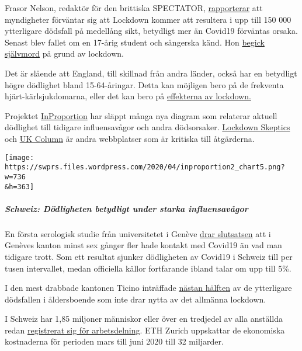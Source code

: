 Frasor Nelson, redaktör för den brittiska SPECTATOR,
\href{https://www.telegraph.co.uk/politics/2020/04/09/boris-worried-lockdown-has-gone-far-can-end/}{rapporterar}
att myndigheter förväntar sig att Lockdown kommer att resultera i upp
till 150 000 ytterligare dödsfall på medellång sikt, betydligt mer än
Covid19 förväntas orsaka. Senast blev fallet om en 17-årig student och
sångerska känd. Hon
\href{https://sports.yahoo.com/coronavirus-bethany-palmer-teenager-death-suicide-152707750.html}{begick
självmord} på grund av lockdown.

Det är slående att England, till skillnad från andra länder, också har
en betydligt högre dödlighet bland 15-64-åringar. Detta kan möjligen
bero på de frekventa hjärt-kärlsjukdomarna, eller det kan bero på
\href{https://www.telegraph.co.uk/global-health/science-and-disease/two-new-waves-deaths-break-nhs-new-analysis-warns/}{effekterna
av lockdown.}

Projektet \href{http://inproportion2.talkigy.com/}{InProportion} har
släppt många nya diagram som relaterar aktuell dödlighet till tidigare
influensavågor och andra dödsorsaker.
\href{https://lockdownsceptics.org/}{Lockdown Skeptics} och
\href{https://www.ukcolumn.org/}{UK Column} är andra webbplatser som är
kritiska till åtgärderna.

\texttt{[image: https://swprs.files.wordpress.com/2020/04/inproportion2\_chart5.png?w=736\\\&h=363]}

\hypertarget{schweiz-duxf6dligheten-betydligt-under-starka-influensavuxe5gor}{%
\subparagraph{\texorpdfstring{\textbf{Schweiz: Dödligheten betydligt
under starka
influensavågor}}{Schweiz: Dödligheten betydligt under starka influensavågor}}\label{schweiz-duxf6dligheten-betydligt-under-starka-influensavuxe5gor}}

En första serologisk studie från universitetet i Genève
\href{https://www.hug-ge.ch/medias/communique-presse/seroprevalence-covid-19-premiere-estimation}{drar
slutsatsen} att i Genèves kanton minst sex gånger fler hade kontakt med
Covid19 än vad man tidigare trott. Som ett resultat sjunker dödligheten
av Covid19 i Schweiz till per tusen intervallet, medan officiella källor
fortfarande ibland talar om upp till 5\%.

I den mest drabbade kantonen Ticino inträffade
\href{https://www.bluewin.ch/de/news/schweiz/sp-chef-levrat-will-die-reichen-schropfen-383977.html}{nästan
hälften} av de ytterligare dödsfallen i åldersboende som inte drar nytta
av det allmänna lockdown.

I Schweiz har 1,85 miljoner människor eller över en tredjedel av alla
anställda redan
\href{https://www.bluewin.ch/de/news/schweiz/sp-chef-levrat-will-die-reichen-schropfen-383977.html}{registrerat
sig för arbetsdelning}. ETH Zurich uppskattar de ekonomiska kostnaderna
för perioden mars till juni 2020 till 32 miljarder.

